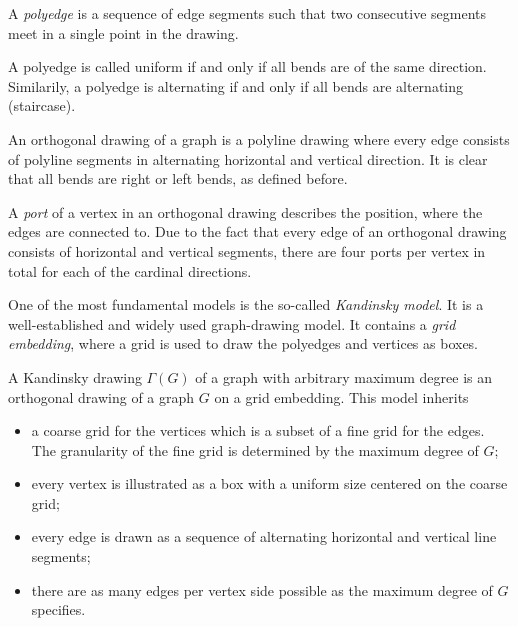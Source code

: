 \begin{definition}[Polyedge]
	A \textit{polyedge} is a sequence of edge segments such that two consecutive segments meet in a single point in the drawing.
\end{definition}
\begin{definition}
	A polyedge is called uniform if and only if all bends are of the same direction. Similarily, a polyedge is alternating if and only if all bends are alternating (staircase).\label{def:uni_alt}
\end{definition}
\begin{definition}
	An orthogonal drawing of a graph is a polyline drawing where every edge consists of polyline segments in alternating horizontal and vertical direction. It is clear that all bends are right or left bends, as defined before.
\end{definition}
\begin{definition}[Ports]
	A \textit{port} of a vertex in an orthogonal drawing describes the position, where the edges are connected to. Due to the fact that every edge of an orthogonal drawing consists of horizontal and vertical segments, there are four ports per vertex in total for each of the cardinal directions.
\end{definition}
One of the most fundamental models is the so-called \textit{Kandinsky model}. It is a well-established and widely used graph-drawing model. It contains a \textit{grid embedding}, where a grid is used to draw the polyedges and vertices as boxes.
\begin{definition}
	A Kandinsky drawing $\Gamma(G)$ of a graph with arbitrary maximum degree is an orthogonal drawing of a graph $G$ on a grid embedding. This model inherits
	\begin{itemize}
		\item a coarse grid for the vertices which is a subset of a fine grid for the edges. The granularity of the fine grid is determined by the maximum degree of $G$;
		\item every vertex is illustrated as a box with a uniform size centered on the coarse grid;
		\item every edge is drawn as a sequence of alternating horizontal and vertical line segments;
		\item there are as many edges per vertex side possible as the maximum degree of $G$ specifies.
	\end{itemize}
\end{definition}
